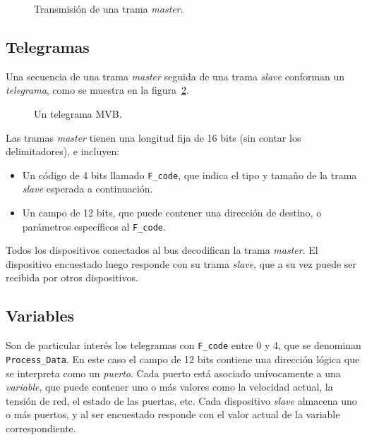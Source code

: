 \begin{figure}[htbp]
	\centering
    {
        \fontsize{8pt}{8pt}\selectfont
        
    }
	\caption[Transmisión de una trama master]{Transmisión de una trama \textit{master}.}
    \label{fig:manchester}
\end{figure}


\subsection{Telegramas}

Una secuencia de una trama \textit{master} seguida de una trama \textit{slave} conforman un \textit{telegrama}, como se muestra en la figura~\ref{fig:telegrama}.

\begin{figure}[htbp]
	\centering
    {
        \fontsize{8pt}{8pt}\selectfont
        
    }
	\caption[Un telegrama MVB]{Un telegrama MVB.}
    \label{fig:telegrama}
\end{figure}

Las tramas \textit{master} tienen una longitud fija de 16 bits (sin contar los delimitadores), e incluyen:

\begin{itemize}
\item Un código de 4 bits llamado \texttt{F\_code}, que indica el tipo y tamaño de la trama \textit{slave} esperada a continuación.
\item Un campo de 12 bits, que puede contener una dirección de destino, o parámetros específicos al \texttt{F\_code}.
\end{itemize}

Todos los dispositivos conectados al bus decodifican la trama \textit{master}. El dispositivo encuestado luego responde con su trama \textit{slave}, que a su vez puede ser recibida por otros dispositivos.

\subsection{Variables}

Son de particular interés los telegramas con \texttt{F\_code} entre 0 y 4, que se denominan \texttt{Process\_Data}. En este caso el campo de 12 bits contiene una dirección lógica que se interpreta como un \textit{puerto}. Cada puerto está asociado unívocamente a una \textit{variable}, que puede contener uno o más valores como la velocidad actual, la tensión de red, el estado de las puertas, etc. Cada dispositivo \textit{slave} almacena uno o más puertos, y al ser encuestado responde con el valor actual de la variable correspondiente.

